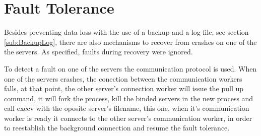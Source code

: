 \documentclass[12pt]{article} %
\begin{document}
\section{Fault Tolerance}
\label{sec:FaultTolerance}

Besides preventing data loss with the use of a backup and a log file, see section \ref{sub:BackupLog}, 
there are also mechanisms to recover from crashes on one of the the servers. 
As specified, faults during recovery were ignored.

To detect a fault on one of the servers the communication protocol is used. 
When one of the servers crashes, the conection between the communication 
workers falls, at that point, the other server's connection worker will issue the pull 
up command, it will fork the process, kill the binded servers in the new process and 
call execv with the oposite server's filename, this one, when it's communication 
worker is ready it connects to the other server's communication worker, in order 
to reestablish the background connection and resume the fault tolerance.

\end{document}
